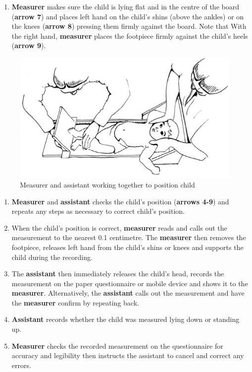 \documentclass[12pt,]{book}
\providecommand{\tightlist}{%
  \setlength{\itemsep}{0pt}\setlength{\parskip}{0pt}}
\theoremstyle{definition}
\theoremstyle{definition}
\theoremstyle{definition}
\theoremstyle{remark}
\begin{document}
\begin{enumerate}
\def\labelenumi{\arabic{enumi}.}
\setcounter{enumi}{6}
\tightlist
\item
  \textbf{Measurer} makes sure the child is lying flat and in the centre
  of the board (\textbf{arrow 7}) and places left hand on the child's
  shins (above the ankles) or on the knees (\textbf{arrow 8}) pressing
  them firmly against the board. Note that With the right hand,
  \textbf{measurer} places the footpiece firmly against the child's
  heels (\textbf{arrow 9}).
\end{enumerate}

\begin{figure}

{\centering \includegraphics[width=8.04in]{images/heightBoard06} 

}

\caption{Measurer and assistant working together to position child}\label{fig:height09}
\end{figure}

\begin{enumerate}
\def\labelenumi{\arabic{enumi}.}
\setcounter{enumi}{7}
\item
  \textbf{Measurer} and \textbf{assistant} checks the child's position
  (\textbf{arrows 4-9}) and repeats any steps as necessary to correct
  child's position.
\item
  When the child's position is correct, \textbf{measurer} reads and
  calls out the measurement to the nearest 0.1 centimetre. The
  \textbf{measurer} then removes the footpiece, releases left hand from
  the child's shins or knees and supports the child during the
  recording.
\item
  The \textbf{assistant} then immediately releases the child's head,
  records the measurement on the paper questionnaire or mobile device
  and shows it to the \textbf{measurer}. Alternatively, the
  \textbf{assistant} calls out the measurement and have the
  \textbf{measurer} confirm by repeating back.
\item
  \textbf{Assistant} records whether the child was measured lying down
  or standing up.
\item
  \textbf{Measurer} checks the recorded measurement on the questionnaire
  for accuracy and legibility then instructs the assistant to cancel and
  correct any errors.
\end{enumerate}
\end{document}
